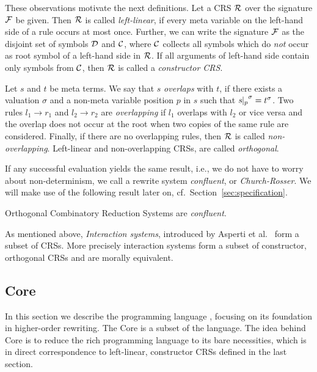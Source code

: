 These observations motivate the next definitions. 
%
Let a CRS $\mathcal{R}$ over the signature $\mathcal{F}$ be given. Then $\mathcal{R}$ is called \emph{left-linear}, 
if every meta variable on the left-hand side of a rule occurs at most once.
Further, we can write the signature $\mathcal{F}$ as the disjoint set of
symbols $\mathcal{D}$ and $\mathcal{C}$, where $\mathcal{C}$ collects all symbols which 
do \emph{not} occur as root symbol of a left-hand side in $\mathcal{R}$. 
If all arguments of left-hand
side contain only symbols from $\mathcal{C}$, then $\mathcal{R}$ is called a \emph{constructor CRS}. 

Let $s$ and $t$ be meta terms. We say that $s$ \emph{overlaps} with $t$, 
if there exists a valuation $\sigma$ and a non-meta variable position 
$p$ in $s$ such that ${{s}\!\!\mid_{p}}^\sigma = t^\sigma$.
Two rules $l_1 \to r_1$ and $l_2 \to r_2$ are
\emph{overlapping} if $l_1$ overlaps with $l_2$ or vice versa and the overlap
does not occur at the root when two copies of the same rule are considered. Finally, if there
are no overlapping rules, then $\mathcal{R}$ is called \emph{non-overlapping}. 
%
Left-linear and non-overlapping CRSs, are called \emph{orthogonal}. 

If any successful evaluation yields the same result, i.e., 
we do not have to worry about non-determinism, we call a rewrite system 
\emph{confluent}, or \emph{Church-Rosser}. 
%
We will make use of the following result later on, cf.~Section~\ref{sec:specification}. 
%
\begin{theorem} \cite{1980_klop} 
\label{t:1}
  Orthogonal Combinatory Reduction Systems are \emph{confluent}.
\end{theorem}

As mentioned above, \emph{Interaction systems}, introduced by Asperti
et al.~\cite{AL:94,AL:96} form a subset of CRSs. More precisely
interaction systems form a subset of constructor, orthogonal CRSs and
are morally equivalent.

\subsection{\Tosca Core} \label{sec:CRStocore}

In this section we describe the programming language \Tosca, focusing
on its foundation in higher-order rewriting.
The \Tosca Core is a subset of the \Tosca language. The
idea behind \Tosca Core is to reduce the rich programming
language \Tosca to its bare necessities, which is in direct
correspondence to left-linear, constructor %
CRSs defined in the last section. 

